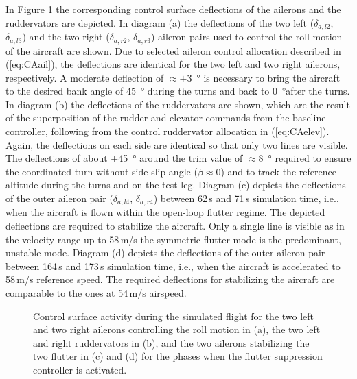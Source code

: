 \documentclass[aerospace,article,submit,moreauthors,pdftex,10pt,a4paper]{Definitions/mdpi}
\begin{document}
In Figure  \ref{fig:d1_patt_act} the corresponding control surface deflections of the ailerons and the ruddervators are depicted. In diagram (a) the deflections of the two left ($\delta_{a,l2}$, $\delta_{a,l3}$) and the two right ($\delta_{a,r2}$, $\delta_{a,r3}$) aileron pairs used to control the roll motion of the aircraft are shown. Due to selected aileron control allocation described in (\ref{eq:CAail}), the deflections are identical for the two left and two right ailerons, respectively. 
A moderate deflection of  $\approx\pm$\SI{3}{\degree} is necessary to bring the aircraft to the desired bank angle of \SI{45}{\degree} during the turns and back to \SI{0}{\degree}after the turns. In diagram (b) the deflections of the ruddervators are shown, which are the result of the  superposition of the rudder and elevator commands from the baseline controller, following from the control ruddervator allocation in (\ref{eq:CAelev}). Again, the deflections on each side are identical so that only two lines are visible. The deflections of about $\pm$\SI{45}{\degree} around the trim value of $\approx$\SI{8}{\degree} required to ensure the coordinated turn without side slip angle ($\beta \approx 0$) and to track the reference altitude during the turns and on the test leg. Diagram (c) depicts the  deflections of the outer aileron pair ($\delta_{a,l4}$, $\delta_{a,r4}$) between 62\,s and 71\,s simulation time, i.e., when the aircraft is flown within the open-loop flutter regime. The depicted deflections are required to stabilize the aircraft. Only a single line is visible as  in the velocity range up to 58\,m/s the symmetric flutter mode is the predominant, unstable mode.
Diagram (d) depicts the deflections of the outer aileron pair between 164\,s and 173\,s simulation time, i.e., when the aircraft is accelerated to 58\,m/s reference speed. The required deflections for stabilizing the aircraft are comparable to the ones at 54\,m/s airspeed.

\begin{figure}[h]
	\centering
	
	\caption{Control surface activity during the simulated flight for the two left and two right ailerons controlling the roll motion in (a), the two left and right ruddervators in (b), and  the two ailerons stabilizing the two flutter in (c) and (d) for the phases when the flutter suppression controller is activated.}
	\label{fig:d1_patt_act}	
\end{figure}
\end{document}
